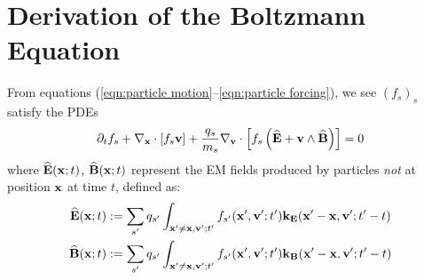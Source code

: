 \chapter{Derivation of the Boltzmann Equation}\label{cha:Boltzmann equation derivation}
    From equations (\ref{eqn:particle motion}–\ref{eqn:particle forcing}), we see $(f_{s})_{s}$ satisfy the PDEs
    \begin{equation}\label{eqn:exact Boltzmann equation}
        \partial_{t}f_{s} + \nabla_{\mathbf{x}}\cdot[f_{s}\mathbf{v}] + \frac{q_{s}}{m_{s}}\nabla_{\mathbf{v}}\cdot\left[f_{s}\left(\widehat{\mathbf{E}} + \mathbf{v}\wedge\widehat{\mathbf{B}}\right)\right]  =  0
    \end{equation}
    where $\widehat{\mathbf{E}}(\mathbf{x}; t)$, $\widehat{\mathbf{B}}(\mathbf{x}; t)$ represent the EM fields produced by particles \emph{not} at position $\mathbf{x}$ at time $t$, defined as:
    \begin{align}
        \widehat{\mathbf{E}}(\mathbf{x}; t)  &:=  \sum_{s'}q_{s'}\int_{\mathbf{x}' \neq \mathbf{x}, \mathbf{v}'; t'}f_{s'}(\mathbf{x}', \mathbf{v}'; t')\mathbf{k}_{\mathbf{E}}(\mathbf{x}' - \mathbf{x}, \mathbf{v}'; t' - t)  \\
        \widehat{\mathbf{B}}(\mathbf{x}; t)  &:=  \sum_{s'}q_{s'}\int_{\mathbf{x}' \neq \mathbf{x}, \mathbf{v}'; t'}f_{s'}(\mathbf{x}', \mathbf{v}'; t')\mathbf{k}_{\mathbf{B}}(\mathbf{x}' - \mathbf{x}, \mathbf{v}'; t' - t)
    \end{align}

